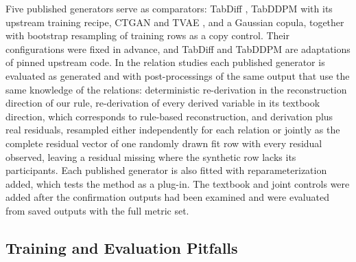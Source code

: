 \documentclass[conference]{IEEEtran}
\begin{document}
Five published generators serve as comparators: TabDiff \cite{shi2025tabdiff}, TabDDPM \cite{kotelnikov2023tabddpm} with its upstream training recipe, CTGAN and TVAE \cite{xu2019ctgan}, and a Gaussian copula, together with bootstrap resampling of training rows as a copy control. Their configurations were fixed in advance, and TabDiff and TabDDPM are adaptations of pinned upstream code. In the relation studies each published generator is evaluated as generated and with post-processings of the same output that use the same knowledge of the relations: deterministic re-derivation in the reconstruction direction of our rule, re-derivation of every derived variable in its textbook direction, which corresponds to rule-based reconstruction, and derivation plus real residuals, resampled either independently for each relation or jointly as the complete residual vector of one randomly drawn fit row with every residual observed, leaving a residual missing where the synthetic row lacks its participants. Each published generator is also fitted with reparameterization added, which tests the method as a plug-in. The textbook and joint controls were added after the confirmation outputs had been examined and were evaluated from saved outputs with the full metric set.

\subsection{Training and Evaluation Pitfalls}
\end{document}
